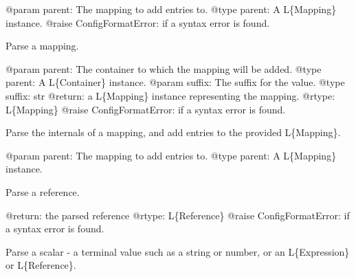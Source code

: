 \documentclass[a4paper,10pt,english]{sphinxmanual}
\begin{document}
\begin{fulllineitems}
\begin{fulllineitems}
@param parent: The mapping to add entries to.
@type parent: A L\{Mapping\} instance.
@raise ConfigFormatError: if a syntax error is found.

\end{fulllineitems}


\begin{fulllineitems}
\label{commands/apidoc/src:src.pyconf.ConfigReader.parseMapping}
Parse a mapping.

@param parent: The container to which the mapping will be added.
@type parent: A L\{Container\} instance.
@param suffix: The suffix for the value.
@type suffix: str
@return: a L\{Mapping\} instance representing the mapping.
@rtype: L\{Mapping\}
@raise ConfigFormatError: if a syntax error is found.

\end{fulllineitems}


\begin{fulllineitems}
\label{commands/apidoc/src:src.pyconf.ConfigReader.parseMappingBody}
Parse the internals of a mapping, and add entries to the provided
L\{Mapping\}.

@param parent: The mapping to add entries to.
@type parent: A L\{Mapping\} instance.

\end{fulllineitems}


\begin{fulllineitems}
\label{commands/apidoc/src:src.pyconf.ConfigReader.parseReference}
Parse a reference.

@return: the parsed reference
@rtype: L\{Reference\}
@raise ConfigFormatError: if a syntax error is found.

\end{fulllineitems}


\begin{fulllineitems}
\label{commands/apidoc/src:src.pyconf.ConfigReader.parseScalar}
Parse a scalar - a terminal value such as a string or number, or
an L\{Expression\} or L\{Reference\}.


\end{fulllineitems}
\end{fulllineitems}
\end{document}
